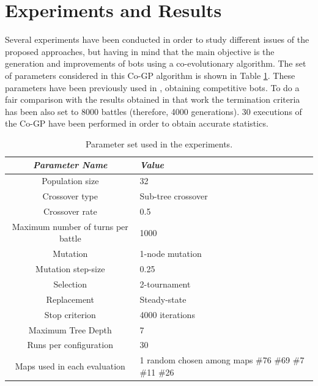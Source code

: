 \documentclass[conference]{IEEEtran}
\begin{document}


%
\section{Experiments and Results}
\label{sec:experiments}

Several experiments have been conducted in order to study different issues of the proposed approaches, but having in mind that the main objective is the generation and improvements of bots using a co-evolutionary algorithm. The set of parameters considered in this Co-GP algorithm is shown in Table \ref{tab:parameters}.
These parameters have been  previously used in \cite{GarciaGP14}, obtaining competitive bots. To do a fair comparison with the results obtained in that work the termination criteria has been also set to 8000 battles (therefore, 4000 generations). 30 executions of the Co-GP have been performed in order to obtain accurate statistics.    %


\begin{table}
\begin{center}
\begin{tabular}{|c|p{2.5cm}|}
\hline
{\em Parameter Name} & {\em Value} \\\hline \hline
Population size & 32 \\\hline
Crossover type & Sub-tree crossover \\ \hline
Crossover rate & 0.5\\ \hline
Maximum number of turns per battle & 1000 \\\hline
Mutation  & 1-node mutation\\ \hline
Mutation step-size & 0.25 \\ \hline
Selection & 2-tournament \\ \hline
Replacement & Steady-state\\ \hline
Stop criterion & 4000 iterations \\ \hline
Maximum Tree Depth & 7  \\ \hline

Runs per configuration & 30 \\ \hline
Maps used in each evaluation & 1 random chosen among maps \#76 \#69 \#7 \#11 \#26\\ \hline
\end{tabular}
\caption{Parameter set used in the experiments.}     %
\label{tab:parameters}
\end{center}
\end{table}
\end{document}
